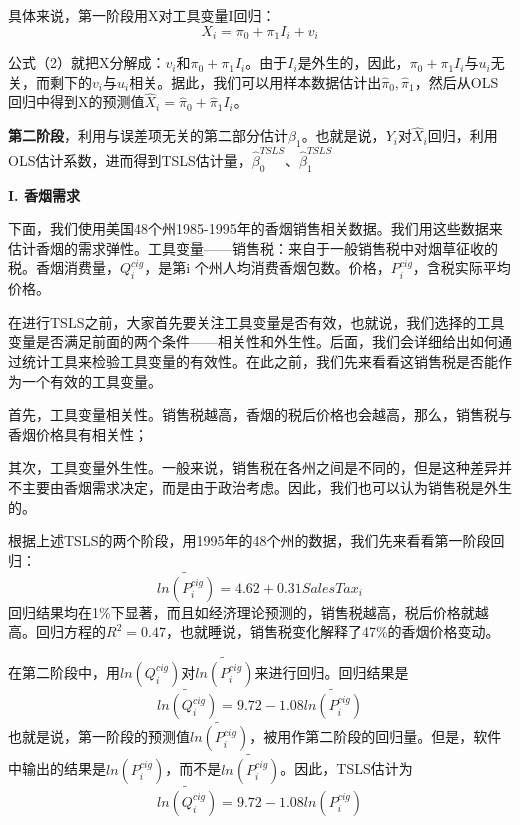 \documentclass[cn,12pt,math=newtx,citestyle=gb7714-2015,bibstyle=gb7714-2015]{elegantbook}
\begin{document}
	具体来说，第一阶段用X对工具变量I回归：
	\begin{equation}
		X_i=\pi_0+\pi_1I_i+v_i
	\end{equation}
	
	公式（2）就把X分解成：$v_i$和$\pi_0+\pi_1I_i$。由于$I_i$是外生的，因此，$\pi_0+\pi_1I_i$与$u_i$无关，而剩下的$v_i$与$u_i$相关。据此，我们可以用样本数据估计出$\hat{\pi}_0,\hat{\pi}_1$，然后从OLS回归中得到X的预测值$\hat{X}_i=\hat{\pi}_0+\hat{\pi}_1I_i$。
	
	\textbf{第二阶段}，利用与误差项无关的第二部分估计$\beta_1$。也就是说，$Y_i$对$\hat{X}_i$回归，利用OLS估计系数，进而得到TSLS估计量，$\hat{\beta}_0^{TSLS}、\hat{\beta}_1^{TSLS}$
	
	\textbf{I. 香烟需求}
	
	下面，我们使用美国48个州1985-1995年的香烟销售相关数据。我们用这些数据来估计香烟的需求弹性。工具变量——销售税：来自于一般销售税中对烟草征收的税。香烟消费量，$Q_i^{cig}$，是第i 个州人均消费香烟包数。价格，$P_i^{cig}$，含税实际平均价格。
	
	在进行TSLS之前，大家首先要关注工具变量是否有效，也就说，我们选择的工具变量是否满足前面的两个条件——相关性和外生性。后面，我们会详细给出如何通过统计工具来检验工具变量的有效性。在此之前，我们先来看看这销售税是否能作为一个有效的工具变量。
	
	首先，工具变量相关性。销售税越高，香烟的税后价格也会越高，那么，销售税与香烟价格具有相关性；
	
	其次，工具变量外生性。一般来说，销售税在各州之间是不同的，但是这种差异并不主要由香烟需求决定，而是由于政治考虑。因此，我们也可以认为销售税是外生的。
	
	根据上述TSLS的两个阶段，用1995年的48个州的数据，我们先来看看第一阶段回归：
	\begin{equation}
		\tilde{ln(P_i^{cig})}=4.62+0.31SalesTax_i
	\end{equation}
	回归结果均在1\%下显著，而且如经济理论预测的，销售税越高，税后价格就越高。回归方程的$R^2=0.47$，也就睡说，销售税变化解释了47\%的香烟价格变动。
	
	在第二阶段中，用$ln(Q_i^{cig})$对$\tilde{ln(P_i^{cig})}$来进行回归。回归结果是
	\begin{equation}
		\tilde{ln(Q_i^{cig})}=9.72-1.08\tilde{ln(P_i^{cig})}
	\end{equation}
	也就是说，第一阶段的预测值$\tilde{ln(P_i^{cig})}$，被用作第二阶段的回归量。但是，软件中输出的结果是$ln(P_i^{cig})$，而不是$\tilde{ln(P_i^{cig})}$。因此，TSLS估计为
	\begin{equation}
		\tilde{ln(Q_i^{cig})}=9.72-1.08ln(P_i^{cig})
	\end{equation}
	
\end{document}

